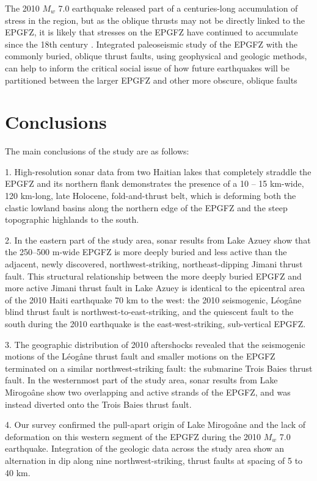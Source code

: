 \documentclass[linenumbers,draft]{agujournal}
\begin{document}
The 2010 $M_w$ 7.0 earthquake released part of a centuries-long accumulation of stress in the region, but as the oblique thrusts may not be directly linked to the EPGFZ, it is likely that stresses on the EPGFZ have continued to accumulate since the 18th century \citep{prentice2010seismic}. Integrated paleoseismic study of the EPGFZ with the commonly buried, oblique thrust faults, using geophysical and geologic methods, can help to inform the critical social issue of how future earthquakes will be partitioned between the larger EPGFZ and other more obscure, oblique faults

\section{Conclusions}
The main conclusions of the study are as follows: 

1. High-resolution sonar data from two Haitian lakes that completely straddle the EPGFZ and its northern flank demonstrates the presence of a 10 -- 15 km-wide, 120 km-long, late Holocene, fold-and-thrust belt, which is deforming both the clastic lowland basins along the northern edge of the EPGFZ and the steep topographic highlands to the south. 

2. In the eastern part of the study area, sonar results from Lake Azuey show that the 250--500 m-wide EPGFZ is more deeply buried and less active than the adjacent, newly discovered, northwest-striking, northeast-dipping Jimani thrust fault. This structural relationship between the more deeply buried EPGFZ and more active Jimani thrust fault in Lake Azuey is identical to the epicentral area of the 2010 Haiti earthquake 70 km to the west: the 2010 seismogenic, L\'eog\^ane blind thrust fault is northwest-to-east-striking, and the quiescent fault to the south during the 2010 earthquake is the east-west-striking, sub-vertical EPGFZ. 

3. The geographic distribution of 2010 aftershocks revealed that the seismogenic motions of the L\'eog\^ane thrust fault and smaller motions on the EPGFZ terminated on a similar northwest-striking fault: the submarine Trois Baies thrust fault. In the westernmost part of the study area, sonar results from Lake Mirogo\^ane show two overlapping and active strands of the EPGFZ, and was instead diverted onto the Trois Baies thrust fault.

4. Our survey confirmed the pull-apart origin of Lake Mirogo\^ane and the lack of deformation on this western segment of the EPGFZ during the 2010 $M_w$ 7.0 earthquake. Integration of the geologic data across the study area show an alternation in dip along nine northwest-striking, thrust faults at spacing of 5 to 40 km.
\end{document}
